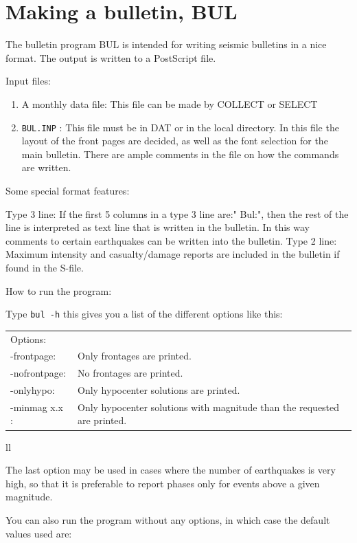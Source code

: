 \section{Making a bulletin, BUL}

The bulletin program BUL is intended for writing seismic bulletins 
in a nice format. The output is written to a PostScript file. 

Input files: 

\begin{enumerate}
\item
A monthly data file: This file can be made by COLLECT or SELECT 
\item
{}\texttt{BUL.INP} : This file must be in DAT or in the local directory. 
In this file the layout of the front pages are decided, as well as 
the font selection for the main bulletin. There are ample comments 
in the file on how the commands are written. 
\end{enumerate}

Some special format features: 

Type 3 line: If the first 5 columns in a type 3 line are:" Bul:", then the rest of the line is interpreted as text line that is written in the bulletin. In this way comments to certain earthquakes can be written into the bulletin. Type 2 line: Maximum intensity and casualty/damage reports are included in the bulletin if found in the S-file. 

How to run the program: 

Type \texttt{bul -h} this gives you a list of the different options like this:

\begin{tabular}{ll}
       Options: & \\
-frontpage: & Only frontages are printed. \\
-nofrontpage: & No frontages are printed. \\
-onlyhypo: & Only hypocenter solutions are printed. \\
-minmag x.x : & Only hypocenter solutions with magnitude than the requested are printed.\\
\end{tabular}{ll}
 
The last option may be used in cases where the number of earthquakes is very high, so that it is preferable to report phases only for events above a given magnitude. 

You can also run the program without any options, in which case the default values used are:  


